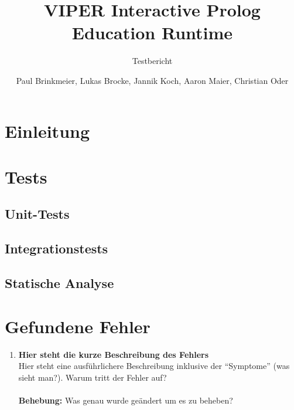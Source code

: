 \documentclass[parskip=full,11pt,twoside]{scrartcl}
\title{VIPER Interactive Prolog Education Runtime}
\subtitle{Testbericht}
\author{Paul Brinkmeier, Lukas Brocke, Jannik Koch, Aaron Maier, Christian Oder}
\begin{document}
\maketitle
\tableofcontents

\section{Einleitung}
\setcounter{page}{1}




\section{Tests}

\subsection{Unit-Tests}



\subsection{Integrationstests}


\subsection{Statische Analyse}


\section{Gefundene Fehler}

\begin{enumerate}[label=\#\arabic*]
  \item \textbf{Hier steht die kurze Beschreibung des Fehlers}\\
        Hier steht eine ausführlichere Beschreibung inklusive der \enquote{Symptome} (was sieht man?). Warum tritt der Fehler auf?\\\\
        \textbf{Behebung:} Was genau wurde geändert um es zu beheben?
\end{enumerate}
\end{document}

